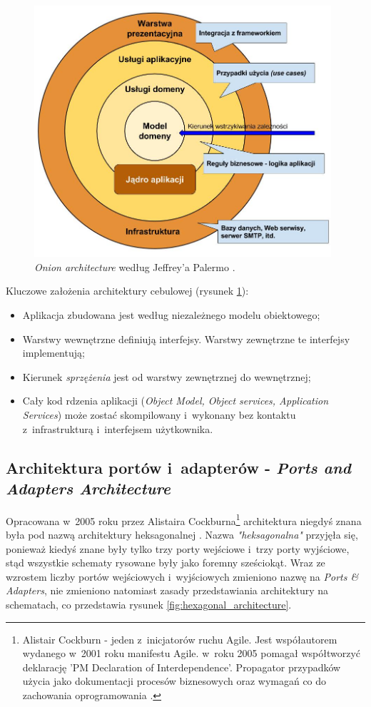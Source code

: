 \begin{figure}[!htb]
    \centering
    \includegraphics[width=11cm]{imgs/ch4_onion_architecture_pl.jpg}
    \caption
{\textit{Onion architecture} według Jeffrey'a Palermo  \cite{website:architect:onion}.}
    \label{fig:onion_architecture}
\end{figure} 

Kluczowe założenia architektury cebulowej (rysunek \ref{fig:onion_architecture}):
\begin{itemize}
\item 
Aplikacja zbudowana jest według niezależnego modelu obiektowego;
\item
Warstwy wewnętrzne definiują interfejsy. Warstwy zewnętrzne te interfejsy implementują;
\item
Kierunek \textit{sprzężenia} jest od warstwy zewnętrznej do wewnętrznej;
\item
Cały kod rdzenia aplikacji (\textit{Object Model, Object services, Application Services}) może zostać skompilowany i~wykonany bez kontaktu z~infrastrukturą i~interfejsem użytkownika.
\end{itemize}


\subsection{Architektura portów i~adapterów - \textit{Ports and Adapters \newline Architecture}}
Opracowana w~2005 roku przez Alistaira Cockburna\footnote{Alistair Cockburn - jeden z~inicjatorów ruchu Agile. Jest współautorem wydanego w~2001 roku manifestu Agile. w~roku 2005 pomagał współtworzyć deklarację 'PM Declaration of Interdependence'. Propagator przypadków użycia jako dokumentacji procesów biznesowych oraz wymagań co do zachowania oprogramowania \cite{website:wikipedia}.} architektura niegdyś znana była pod nazwą architektury heksagonalnej \cite{website:architect:hexagonal}. Nazwa \textit{"heksagonalna"} przyjęła się, ponieważ kiedyś znane były tylko trzy porty wejściowe i~trzy porty wyjściowe, stąd wszystkie schematy rysowane były jako foremny sześciokąt. Wraz ze wzrostem liczby portów wejściowych i~wyjściowych zmieniono nazwę na \textit{Ports \& Adapters}, nie zmieniono natomiast zasady przedstawiania architektury na schematach, co przedstawia rysunek \ref{fig:hexagonal_architecture}.

